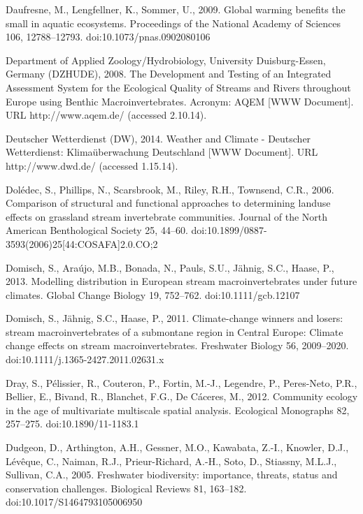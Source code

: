 \begin{thebibliography}
\bibitem{} \hangindent=1cm Daufresne, M., Lengfellner, K., Sommer, U., 2009. Global warming benefits the small in aquatic ecosystems. Proceedings of the National Academy of Sciences 106, 12788–12793. doi:10.1073/pnas.0902080106

\bibitem{} \hangindent=1cm Department of Applied Zoology/Hydrobiology, University Duisburg-Essen, Germany (DZHUDE), 2008. The Development and Testing of an Integrated Assessment System for the Ecological Quality of Streams and Rivers throughout Europe using Benthic Macroinvertebrates. Acronym: AQEM [WWW Document]. URL http://www.aqem.de/ (accessed 2.10.14).

\bibitem{} \hangindent=1cm Deutscher Wetterdienst (DW), 2014. Weather and Climate - Deutscher Wetterdienst: Klimaüberwachung Deutschland [WWW Document]. URL http://www.dwd.de/ (accessed 1.15.14).

\bibitem{} \hangindent=1cm Dolédec, S., Phillips, N., Scarsbrook, M., Riley, R.H., Townsend, C.R., 2006. Comparison of structural and functional approaches to determining landuse effects on grassland stream invertebrate communities. Journal of the North American Benthological Society 25, 44–60. doi:10.1899/0887-3593(2006)25[44:COSAFA]2.0.CO;2

\bibitem{} \hangindent=1cm Domisch, S., Araújo, M.B., Bonada, N., Pauls, S.U., Jähnig, S.C., Haase, P., 2013. Modelling distribution in European stream macroinvertebrates under future climates. Global Change Biology 19, 752–762. doi:10.1111/gcb.12107

\bibitem{} \hangindent=1cm Domisch, S., Jähnig, S.C., Haase, P., 2011. Climate-change winners and losers: stream macroinvertebrates of a submontane region in Central Europe: Climate change effects on stream macroinvertebrates. Freshwater Biology 56, 2009–2020. doi:10.1111/j.1365-2427.2011.02631.x

\bibitem{} \hangindent=1cm Dray, S., Pélissier, R., Couteron, P., Fortin, M.-J., Legendre, P., Peres-Neto, P.R., Bellier, E., Bivand, R., Blanchet, F.G., De Cáceres, M., 2012. Community ecology in the age of multivariate multiscale spatial analysis. Ecological Monographs 82, 257–275. doi:10.1890/11-1183.1

\bibitem{} \hangindent=1cm Dudgeon, D., Arthington, A.H., Gessner, M.O., Kawabata, Z.-I., Knowler, D.J., Lévêque, C., Naiman, R.J., Prieur-Richard, A.-H., Soto, D., Stiassny, M.L.J., Sullivan, C.A., 2005. Freshwater biodiversity: importance, threats, status and conservation challenges. Biological Reviews 81, 163–182. doi:10.1017/S1464793105006950


\end{thebibliography}
